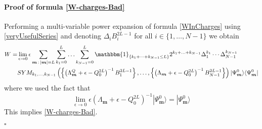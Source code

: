 \documentclass[10pt]{article}
\numberwithin{equation}{section}
\numberwithin{equation}{subsection}
\begin{document}
\paragraph{Proof of formula \eqref{W-charges-Bad}}
Performing a multi-variable power expansion of formula \eqref{WInCharges} using \eqref{veryUsefulSeries} and denoting $\Delta_{i} B_{i}^{2L-1}$ for all $i\in\{1,\ldots,N-1\}$  we obtain 
\begin{equation}
	\begin{split}
		W=&\lim_{\epsilon\to 0}\epsilon\sum_{\bm{m}\,:\,|\bm{m}|=L}\sum_{k_{1}=0}^{L}\ldots\sum_{k_{N-1}=0}^{L}\mathbbm{1}_{\{k_{1}+\cdots+k_{N-1}\leq L\}}2^{k_{1}+\ldots+k_{N-1}}\Delta_{1}^{k_{1}}\cdots\Delta_{N-1}^{k_{N-1}}\\&SYM_{k_{1},\ldots,k_{N-1}}\left(\left\{\left(\Lambda_{\bm{m}}^{Q}+\epsilon-Q_{0}^{2L}\right)^{-1}B_{1}^{2L-1}\right\},\ldots,\left\{\left(\Lambda_{\bm{m}}+\epsilon-Q_{0}^{2L}\right)^{-1}B_{N-1}^{2L-1}\right\}\right)|\Psi_{\bm{m}}^{0}\rangle \langle \Psi_{\bm{m}}^{0}|
	\end{split}
\end{equation} 
where we used the fact that 
\begin{equation}
	\lim_{\epsilon\to 0}	\epsilon\left(\Lambda_{\bm{m}}+\epsilon-Q_{0}^{2L}\right)^{-1}|\Psi_{\bm{m}}^{0}\rangle=|\Psi_{\bm{m}}^{0}\rangle
\end{equation}
This implies \eqref{W-charges-Bad}. 
\begin{flushright}
	$\square$
\end{flushright}
\end{document}
